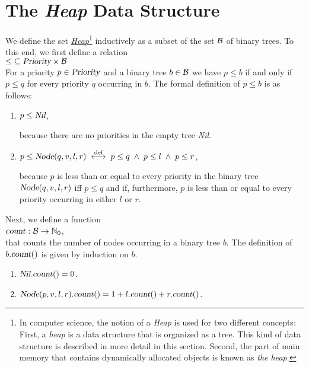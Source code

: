 \section[Heaps]{The \emph{Heap} Data Structure}
We define the set \href{https://en.wikipedia.org/wiki/Heap_(data_structure)}{\textsl{Heap}}\footnote{
In computer science, the notion of a \textsl{Heap} is used for two different concepts:
First, a \emph{heap} is a data structure that is organized as a tree.  This kind of data structure
is described in more detail in this section. Second, the part of main memory that contains dynamically
allocated objects is known as \emph{the heap}.}
inductively as a subset of the set $\mathcal{B}$ of binary trees.  To this end, we first define a relation
\\[0.2cm]
\hspace*{1.3cm}
$\leq \;\subseteq \textsl{Priority}  \times \mathcal{B}$
\\[0.2cm]
For a priority $p \in \textsl{Priority}$ and a binary tree $b \in \mathcal{B}$ we have  $p \leq b$ 
if and only if $p \leq q$ for every priority $q$ occurring in $b$.  The formal definition of 
$p \leq b$ is as follows:
\begin{enumerate}
\item $p \leq \textsl{Nil}$,

      because there are no priorities in the empty tree \textsl{Nil}.
\item $p \leq \textsl{Node}(q,v,l,r) \;\stackrel{\mbox{\scriptsize def}}{\longleftrightarrow}\; p \leq q \;\wedge\; p \leq l \;\wedge\; p \leq r$,
         
      because $p$ is less than or equal to every priority in the binary tree 
      $\textsl{Node}(q,v,l,r)$ iff  $p \leq q$ and if, furthermore, 
      $p$ is less than or equal to every priority occurring in either  $l$ or $r$.
\end{enumerate}
Next, we define a function \\[0.1cm]
\hspace*{1.3cm} $\textsl{count}: \mathcal{B} \rightarrow \mathbb{N}_0$, \\[0.1cm]
that counts the number of nodes occurring in a binary tree $b$.  The definition of
$b.\textsl{count}()$ is given by induction on $b$.
\begin{enumerate}
\item $\textsl{Nil}.\textsl{count}() = 0$.
\item $\textsl{Node}(p,v,l,r).\textsl{count}() = 1 + l.\textsl{count}() + r.\textsl{count}()$.
\end{enumerate}
